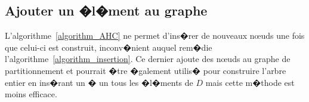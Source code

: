             






\subsection{Ajouter un �l�ment au graphe}
\label{section_alternative}

L'algorithme~\ref{algorithm_AHC} ne permet d'ins�rer de nouveaux n\oe uds une fois que celui-ci est construit, inconv�nient auquel rem�die l'algorithme~\ref{algorithm_insertion}. Ce dernier ajoute des n\oe uds au graphe de partitionnement et pourrait �tre �galement utilis� pour construire l'arbre entier en ins�rant un � un tous les �l�ments de $D$ mais cette m�thode est moins efficace.



